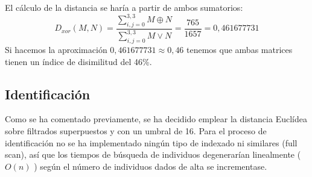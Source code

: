 El cálculo de la distancia se haría a partir de ambos sumatorios:
\[D_{xor}(M,N) = \frac 
	{\sum_{i,j=0}^{3,3} M \oplus N} 
	{\sum_{i,j=0}^{3,3} M \vee N} = \frac {765}{1657} = 0,461677731
\]
Si hacemos la aproximación $ 0,461677731 \approx 0,46 $ tenemos que ambas matrices tienen un índice de disimilitud del 46\%.


\subsection{Identificación}
Como se ha comentado previamente, se ha decidido emplear la distancia Euclídea sobre filtrados superpuestos y con un umbral de 16. Para el proceso de identificación no se ha implementado ningún tipo de indexado ni similares (full scan), así que los tiempos de búsqueda de individuos degenerarían linealmente ( $O(n)$ ) según el número de individuos dados de alta se incrementase.
